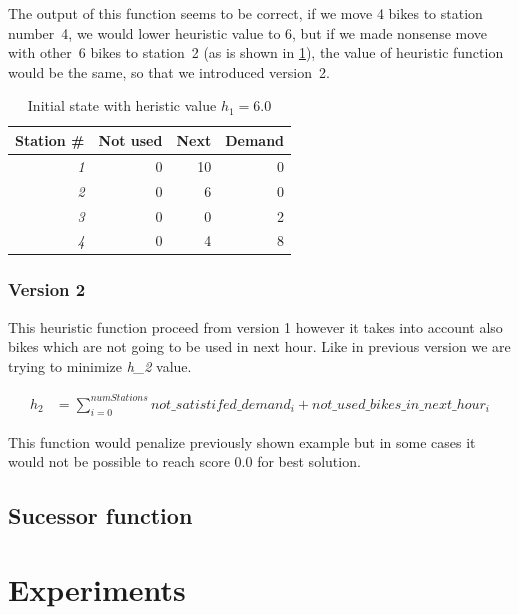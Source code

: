\documentclass[11pt,twoside,a4paper]{mr}%
\begin{document}
The output of this function seems to be correct, if we move 4 bikes to station number~4, we would lower heuristic value to 6, but if we made nonsense move with other~6 bikes to station~2 (as is shown in \ref{t:ex1b}), the value of heuristic function would be the same, so that we introduced version~2.

 \begin{table}[!t]
\renewcommand{\arraystretch}{1.1}

\label{t:ex1b}
\begin{center}
\begin{tabular}[t]{|r|r|r|r|}
\hline
\bf Station \# & \bf Not used & \bf Next &\bf Demand\\ \hline\hline
\sl1 & 0 & 10 & 0\\ \hline
\sl2 & 0 & 6 & 0\\ \hline
\sl3 & 0 & 0 & 2\\ \hline
\sl4 & 0 & 4 & 8\\ \hline
\end{tabular}
\end{center}
\caption{Initial state with heristic value \(h_1= 6.0\)}
\end{table}

\subsection*{Version 2}
This heuristic function proceed from version 1 however it takes into account also bikes which are not going to be used in next hour. Like in previous version we are trying to minimize \textsl{h\_2} value.

\begin{align}
 h_2 &=\sum\limits_{i=0}^{numStations} not\_satistifed\_demand_i + not\_used\_bikes\_in\_next\_hour_i
\end{align}

This function would penalize previously shown example but in some cases it would not be possible to reach score 0.0 for best solution.

\sub

\section{Sucessor function}


\chapter{Experiments}
\end{document}
